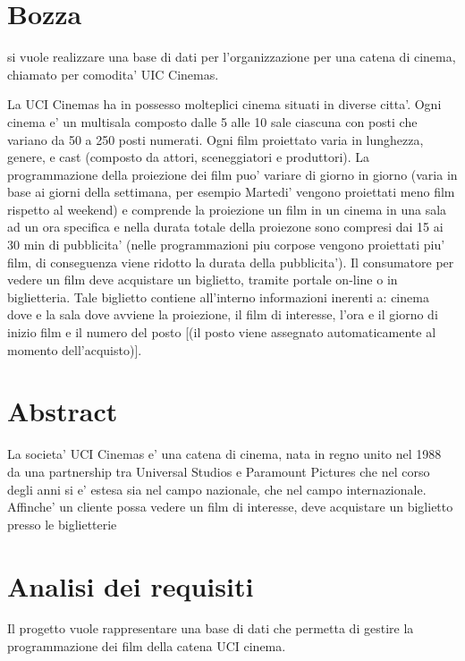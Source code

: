 \documentclass[10pt]{article}
\begin{document}
	\section{Bozza}
	si vuole realizzare una base di dati per l'organizzazione per una catena di cinema, chiamato per comodita' UIC Cinemas.
	
	La UCI Cinemas ha in possesso molteplici cinema situati in diverse citta'. Ogni cinema e' un multisala composto dalle 5 alle 10 sale ciascuna con posti che variano da 50 a 250 posti numerati. Ogni film proiettato varia  in lunghezza, genere, e cast (composto  da attori, sceneggiatori e produttori).
	La programmazione della proiezione dei film puo' variare di giorno in giorno (varia in base ai giorni della settimana, per esempio Martedi' vengono proiettati meno film rispetto al weekend) e comprende la proiezione un film in un cinema in una sala ad un ora specifica e nella durata totale della proiezone sono compresi dai 15 ai 30 min di pubblicita' (nelle programmazioni piu corpose vengono proiettati piu' film, di conseguenza viene ridotto la durata della pubblicita').
	Il consumatore per vedere un film deve acquistare un biglietto, tramite portale on-line o in biglietteria. Tale biglietto contiene all'interno informazioni inerenti a: cinema dove e la sala dove avviene la proiezione, il film di interesse, l'ora e il giorno di inizio film e il numero del posto [(il posto viene assegnato automaticamente al momento dell'acquisto)].
	
	
	\section{Abstract}
	
	La societa' UCI Cinemas e' una catena di cinema, nata in regno unito nel 1988 da una partnership tra Universal Studios e Paramount Pictures che nel corso degli anni si e' estesa sia nel campo nazionale, che nel campo internazionale. 
	Affinche' un cliente possa vedere un film di interesse, deve acquistare un biglietto presso le biglietterie 
	
	\section{Analisi dei requisiti}
	
	Il progetto vuole rappresentare una base di dati che permetta di gestire la programmazione dei film della catena UCI cinema.
	
\end{document}
